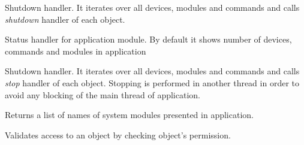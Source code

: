 \documentclass[letterpaper,10pt,english]{sphinxmanual}
\begin{document}
\begin{fulllineitems}

\begin{fulllineitems}
\label{sysmod:pyfrid.modules.system.app.BaseApplicationModule.shutdown}
Shutdown handler. It iterates over all devices, modules and commands and calls \emph{shutdown} handler of each object.

\end{fulllineitems}


\begin{fulllineitems}
\label{sysmod:pyfrid.modules.system.app.BaseApplicationModule.status}
Status handler for application module. By default it shows number of devices, commands and modules in application

\end{fulllineitems}


\begin{fulllineitems}
\label{sysmod:pyfrid.modules.system.app.BaseApplicationModule.stop}
Shutdown handler. It iterates over all devices, modules and commands and calls \emph{stop} handler of each object.
Stopping is performed in another thread in order to avoid any blocking of the main thread of application.

\end{fulllineitems}


\begin{fulllineitems}
\label{sysmod:pyfrid.modules.system.app.BaseApplicationModule.sysmods}
Returns a list of names of system modules presented in application.

\end{fulllineitems}


\begin{fulllineitems}
\label{sysmod:pyfrid.modules.system.app.BaseApplicationModule.validate_access}
Validates access to an object by checking object's permission.


\end{fulllineitems}
\end{fulllineitems}
\end{document}
